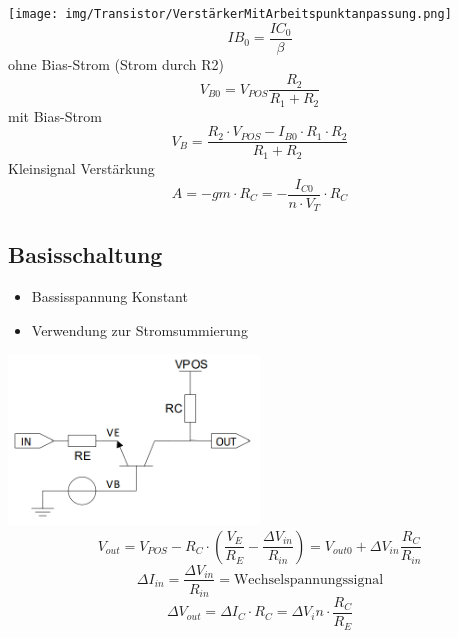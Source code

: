 \documentclass[margin=normal]{tex/hsrzf}
\begin{document}
\begin{minipage}{0.49\textwidth}
  \texttt{[image: img/Transistor/VerstärkerMitArbeitspunktanpassung.png]}
  $$IB_0 = \frac{IC_0}{\beta}$$
  {\small ohne Bias-Strom (Strom durch R2)}
  $$V_{B0} = V_{POS} \frac{R_2}{R_1 + R_2}$$
  {\small mit Bias-Strom}
  $$V_B = \frac{R_2 \cdot V_{POS} - I_{B0} \cdot R_1 \cdot R_2}{R_1 + R_2}$$
  {\small Kleinsignal Verstärkung}
  $$A = -gm \cdot R_C = -\frac{I_{C0}}{n\cdot V_T}\cdot R_C$$
\end{minipage}
\begin{minipage}{0.49\textwidth}

  \subsection{Basisschaltung}
  \begin{itemize}[leftmargin=*]
    \item Bassisspannung Konstant
    \item Verwendung zur Stromsummierung
  \end{itemize}
  \includegraphics[width = 0.5\textwidth]{img/Transistor/Basisschaltung2.png}
  $$V_{out} = V_{POS} - R_C \cdot (\frac{V_E}{R_E} - \frac{\Delta V_{in}}{R_{in}}) = V_{out0} + \Delta V_{in} \frac{R_C}{R_{in}}$$
  $$\Delta I_{in} = \frac{\Delta V_{in}}{R_{in}} = \textrm{Wechselspannungssignal}$$
  $$\Delta V_{out} = \Delta I_{C} \cdot R_C = \Delta V_in \cdot \frac{R_C}{R_E}$$

\end{minipage}%
\end{document}
